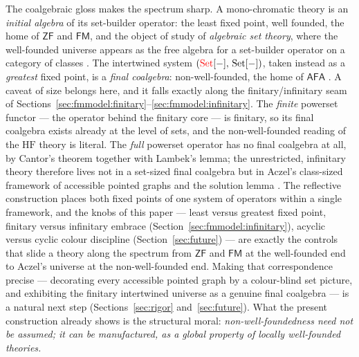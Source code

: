 The coalgebraic gloss makes the spectrum sharp. A mono-chromatic theory is an
\emph{initial algebra} of its set-builder operator: the least fixed point, well
founded, the home of $\mathsf{ZF}$ and $\mathsf{FM}$, and the object of study of
\emph{algebraic set theory}, where the well-founded universe appears as the free
algebra for a set-builder operator on a category of classes
\cite{joyal1995algebraic,awodey2008ast}. The intertwined system
$(\textcolor{red}{\mathrm{Set}}[-],\,\textcolor{black}{\mathrm{Set}}[-])$, taken instead as a \emph{greatest}
fixed point, is a \emph{final coalgebra}: non-well-founded, the home of
$\mathsf{AFA}$ \cite{aczel1988nwf,barwise1996vicious}. A caveat of size belongs
here, and it falls exactly along the finitary/infinitary seam of
Sections~\ref{sec:fmmodel:finitary}--\ref{sec:fmmodel:infinitary}. The
\emph{finite} powerset functor --- the operator behind the finitary core --- is
finitary, so its final coalgebra exists already at the level of sets, and the
non-well-founded reading of the $\mathrm{HF}$ theory is literal. The
\emph{full} powerset operator has no final coalgebra at all, by Cantor's theorem
together with Lambek's lemma; the unrestricted, infinitary theory therefore lives
not in a set-sized final coalgebra but in Aczel's class-sized framework of
accessible pointed graphs and the solution lemma \cite{aczel1988nwf}. The
reflective construction places both fixed points of one system of operators within
a single framework, and the knobs of this paper --- least versus greatest fixed
point, finitary versus infinitary embrace (Section~\ref{sec:fmmodel:infinitary}),
acyclic versus cyclic colour discipline (Section~\ref{sec:future}) --- are
exactly the controls that slide a theory along the spectrum from $\mathsf{ZF}$
and $\mathsf{FM}$ at the well-founded end to Aczel's universe at the
non-well-founded end. Making that correspondence precise --- decorating every
accessible pointed graph by a colour-blind set picture, and exhibiting the
finitary intertwined universe as a genuine final coalgebra --- is a natural next
step (Sections~\ref{sec:rigor} and~\ref{sec:future}). What the present
construction already shows is the structural moral:
\emph{non-well-foundedness need not be assumed; it can be manufactured, as a
global property of locally well-founded theories.}
